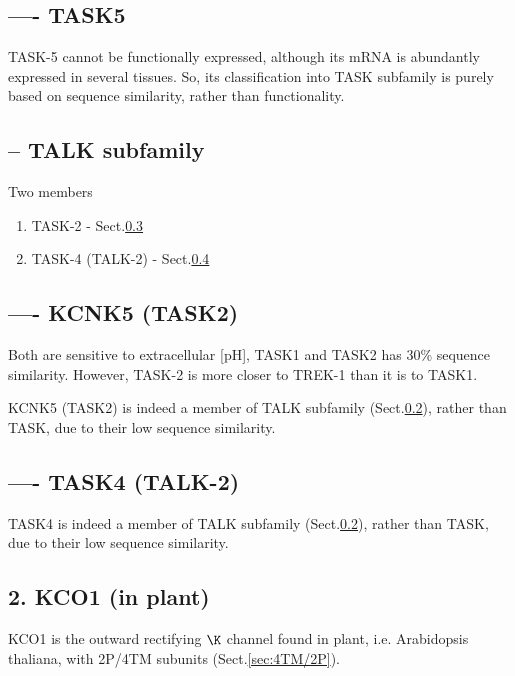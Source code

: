 \subsection{---- TASK5}
\label{sec:TASK5}

TASK-5 cannot be functionally expressed, although
its mRNA is abundantly expressed in several tissues.
So, its classification into TASK subfamily is purely based on sequence
similarity, rather than functionality.


\subsection{-- TALK subfamily}
\label{sec:TALK-subfamily}

Two members
\begin{enumerate}
  \item TASK-2 - Sect.\ref{sec:TASK2}
  
  \item TASK-4 (TALK-2) - Sect.\ref{sec:TASK4}
\end{enumerate}

\subsection{---- KCNK5 (TASK2)}
\label{sec:TASK2}
\label{sec:KCNK5}

Both are sensitive to extracellular [pH], TASK1 and TASK2 has 30\% sequence
similarity. However, TASK-2 is more  closer to TREK-1 than it is to TASK1.

KCNK5 (TASK2) is indeed a member of TALK subfamily
(Sect.\ref{sec:TALK-subfamily}), rather than TASK, due to their low sequence
similarity.

\subsection{---- TASK4 (TALK-2)}
\label{sec:TASK4}
\label{sec:TALK-2}

TASK4 is indeed a member of TALK subfamily (Sect.\ref{sec:TALK-subfamily}),
rather than TASK, due to their low sequence similarity.



\subsection{2. KCO1 (in plant)}
\label{sec:KCO1}

KCO1 is the outward rectifying $\K$ channel found in plant, i.e. Arabidopsis
thaliana, with 2P/4TM subunits (Sect.\ref{sec:4TM/2P}).

